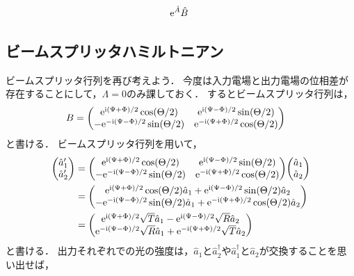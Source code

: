 \documentclass{report}
\begin{document}
    \begin{align}
      \mathrm{e}^{\hat{A}}\hat{B}\
    \end{align}
  \subsection{ビームスプリッタハミルトニアン}
    ビームスプリッタ行列を再び考えよう．
    今度は入力電場と出力電場の位相差が存在することにして，$\Lambda = 0$のみ課しておく．
    するとビームスプリッタ行列は，
    \begin{align}
      B &= \mqty(
        \e^{\i(\Psi + \Phi) / 2}\cos(\Theta / 2) & \e^{\i(\Psi - \Phi) / 2}\sin(\Theta / 2) \\ 
        -\e^{-\i(\Psi - \Phi) / 2}\sin(\Theta / 2) & \e^{-\i(\Psi + \Phi) / 2}\cos(\Theta / 2)
      )
    \end{align}
    と書ける．
    ビームスプリッタ行列を用いて，
    \begin{align}
      \mqty(\hat{a}_1' \\ \hat{a}_2')
      &= \mqty(
        \e^{\i(\Psi + \Phi) / 2}\cos(\Theta / 2) & \e^{\i(\Psi - \Phi) / 2}\sin(\Theta / 2) \\ 
        -\e^{-\i(\Psi - \Phi) / 2}\sin(\Theta / 2) & \e^{-\i(\Psi + \Phi) / 2}\cos(\Theta / 2) \\ 
      )\mqty(\hat{a}_1 \\ \hat{a}_2) \\ 
      &= \mqty(
        \e^{\i(\Psi + \Phi) / 2}\cos(\Theta / 2)\hat{a}_1 + \e^{\i(\Psi - \Phi) / 2}\sin(\Theta / 2)\hat{a}_2 \\ 
        -\e^{-\i(\Psi - \Phi) / 2}\sin(\Theta / 2)\hat{a}_1 + \e^{-\i(\Psi + \Phi) / 2}\cos(\Theta / 2)\hat{a}_2 \\ 
      ) \\ 
      &= \mqty(
        \e^{\i(\Psi + \Phi) / 2}\sqrt{T}\hat{a}_1 - \e^{\i(\Psi - \Phi) / 2}\sqrt{R}\hat{a}_2 \\ 
        \e^{-\i(\Psi - \Phi) / 2}\sqrt{R}\hat{a}_1 + \e^{-\i(\Psi + \Phi) / 2}\sqrt{T}\hat{a}_2 \\ 
      )
    \end{align}
    と書ける．
    出力それぞれでの光の強度は，$\hat{a}_1$と$\hat{a}_2^{\dag}$や$\hat{a}_1^{\dag}$と$\hat{a}_2$が交換することを思い出せば，
\end{document}

